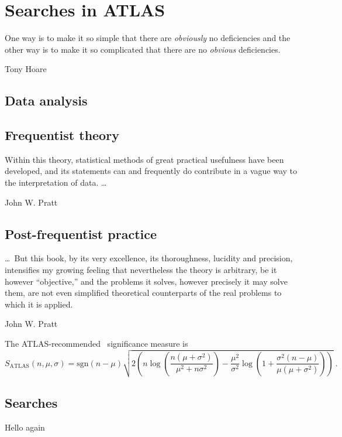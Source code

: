 \chapter{Searches in ATLAS}
\label{chapter:intro}

\epigraph{%
One way is to make it so simple that there are \emph{obviously} no deficiencies
and the other way is to make it so complicated that there are no \emph{obvious}
deficiencies.%
}%
{Tony Hoare~\cite{hoare2007emperor}}



\section{Data analysis}

\section{Frequentist theory}

\epigraph{%
Within this theory, statistical methods of great practical usefulness have been
developed, and its statements can and frequently do contribute in a vague way
to the interpretation of data. \ldots%
}%
{John W. Pratt~\cite{pratt1961testing}}


\section{Post-frequentist practice}

\epigraph{%
\ldots\ But this book, by its very excellence, its thoroughness, lucidity and
precision, intensifies my growing feeling that nevertheless the theory is
arbitrary, be it however ``objective,'' and the problems it solves, however
precisely it may solve them, are not even simplified theoretical counterparts
of the real problems to which it is applied.%
}%
{John W. Pratt~\cite{pratt1961testing}}


The ATLAS-recommended~\cite{atlas_significance} significance measure is
\begin{equation}
\label{eqn:significance_atlas}
S_\mathrm{ATLAS}(n, \mu, \sigma)
= \mathrm{sgn}(n - \mu) \sqrt{2\left(
    n\log\left(\frac{n(\mu + \sigma^2)}{\mu^2 + n\sigma^2}\right)
    - \frac{\mu^2}{\sigma^2}\log\left(
        1 + \frac{\sigma^2(n - \mu)}{\mu(\mu + \sigma^2)}
    \right)
\right)}
~.
\end{equation}


\section{Searches}

\clearpage

Hello again
